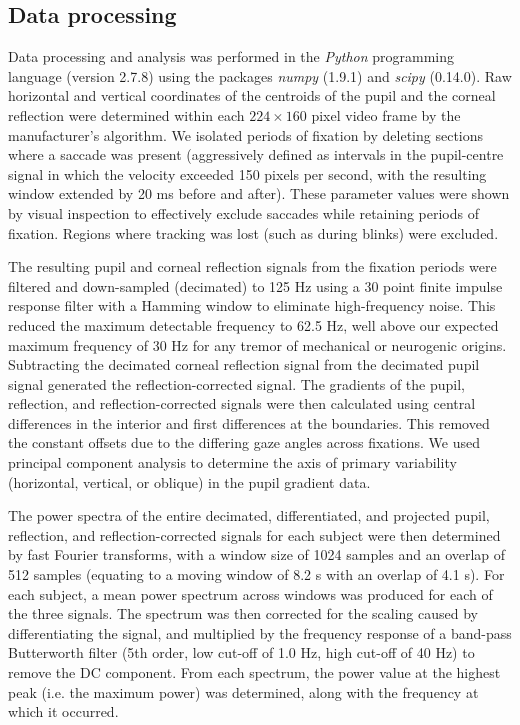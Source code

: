 \documentclass[jou,a4paper]{apa6}
\begin{document}
\subsection{Data processing}
Data processing and analysis was performed in the \textit{Python} programming language (version 2.7.8) using the packages \textit{numpy} (1.9.1) and \textit{scipy} (0.14.0). Raw horizontal and vertical coordinates of the centroids of the pupil and the corneal reflection were determined within each $224 \times 160$ pixel video frame by the manufacturer's algorithm. We isolated periods of fixation by deleting sections where a saccade was present (aggressively defined as intervals in the pupil-centre signal in which the velocity exceeded 150 pixels per second, with the resulting window extended by 20 ms before and after). These parameter values were shown by visual inspection to effectively exclude saccades while retaining periods of fixation. Regions where tracking was lost (such as during blinks) were excluded.

The resulting pupil and corneal reflection signals from the fixation periods were filtered and down-sampled (decimated) to 125 Hz using a 30 point finite impulse response filter with a Hamming window to eliminate high-frequency noise. This reduced the maximum detectable frequency to 62.5 Hz, well above our expected maximum frequency of 30 Hz for any tremor of mechanical or neurogenic origins. Subtracting the decimated corneal reflection signal from the decimated pupil signal generated the reflection-corrected signal. The gradients of the pupil, reflection, and reflection-corrected signals were then calculated using central differences in the interior and first differences at the boundaries. This removed the constant offsets due to the differing gaze angles across fixations. We used principal component analysis to determine the axis of primary variability (horizontal, vertical, or oblique) in the pupil gradient data.

The power spectra of the entire decimated, differentiated, and projected pupil, reflection, and reflection-corrected signals for each subject were then determined by fast Fourier transforms, with a window size of 1024 samples and an overlap of 512 samples (equating to a moving window of 8.2 s with an overlap of 4.1 s). For each subject, a mean power spectrum across windows was produced for each of the three signals. The spectrum was then corrected for the scaling caused by differentiating the signal, and multiplied by the frequency response of a band-pass Butterworth filter (5th order, low cut-off of 1.0 Hz, high cut-off of 40 Hz) to remove the DC component. From each spectrum, the power value at the highest peak (i.e. the maximum power) was determined, along with the frequency at which it occurred.
\end{document}
